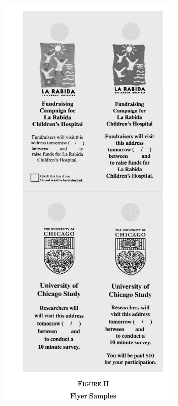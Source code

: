 \documentclass[../root]{subfiles}
\begin{document}
    \begin{figure}[t]
        \centering
        \includegraphics[width = .5\linewidth]{0821kato/fig2_2.png}
        \label{}
    \end{figure}
    
\end{document}

